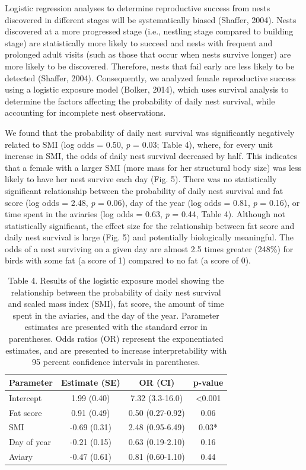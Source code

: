 \documentclass[
]{article}
\begin{document}
Logistic regression analyses to determine reproductive success from
nests discovered in different stages will be systematically biased
(Shaffer, 2004). Nests discovered at a more progressed stage (i.e.,
nestling stage compared to building stage) are statistically more likely
to succeed and nests with frequent and prolonged adult visits (such as
those that occur when nests survive longer) are more likely to be
discovered. Therefore, nests that fail early are less likely to be
detected (Shaffer, 2004). Consequently, we analyzed female reproductive
success using a logistic exposure model (Bolker, 2014), which uses
survival analysis to determine the factors affecting the probability of
daily nest survival, while accounting for incomplete nest observations.

We found that the probability of daily nest survival was significantly
negatively related to SMI (log odds = 0.50, \emph{p} = 0.03; Table 4),
where, for every unit increase in SMI, the odds of daily nest survival
decreased by half. This indicates that a female with a larger SMI (more
mass for her structural body size) was less likely to have her nest
survive each day (Fig. 5). There was no statistically significant
relationship between the probability of daily nest survival and fat
score (log odds = 2.48, \emph{p} = 0.06), day of the year (log odds =
0.81, \emph{p} = 0.16), or time spent in the aviaries (log odds = 0.63,
\emph{p} = 0.44, Table 4). Although not statistically significant, the
effect size for the relationship between fat score and daily nest
survival is large (Fig. 5) and potentially biologically meaningful. The
odds of a nest surviving on a given day are almost 2.5 times greater
(248\%) for birds with some fat (a score of 1) compared to no fat (a
score of 0).

\begin{table}

\caption{\label{tab:logexp}Table 4. Results of the logistic exposure model showing the relationship between the probability of daily nest survival and scaled mass index (SMI), fat score, the amount of time spent in the aviaries, and the day of the year. Parameter estimates are presented with the standard error in parentheses. Odds ratios (OR) represent the exponentiated estimates, and are presented to increase interpretability with 95 percent confidence intervals in parentheses.}
\centering
\begin{tabular}[t]{lccc}
\toprule
Parameter & Estimate (SE) & OR (CI) & p-value\\
\midrule
Intercept & 1.99 (0.40) & 7.32 (3.3-16.0) & <0.001\\
Fat score & 0.91 (0.49) & 0.50 (0.27-0.92) & 0.06\\
SMI & -0.69 (0.31) & 2.48 (0.95-6.49) & 0.03*\\
Day of year & -0.21 (0.15) & 0.63 (0.19-2.10) & 0.16\\
Aviary & -0.47 (0.61) & 0.81 (0.60-1.10) & 0.44\\
\bottomrule
\end{tabular}
\end{table}
\end{document}
